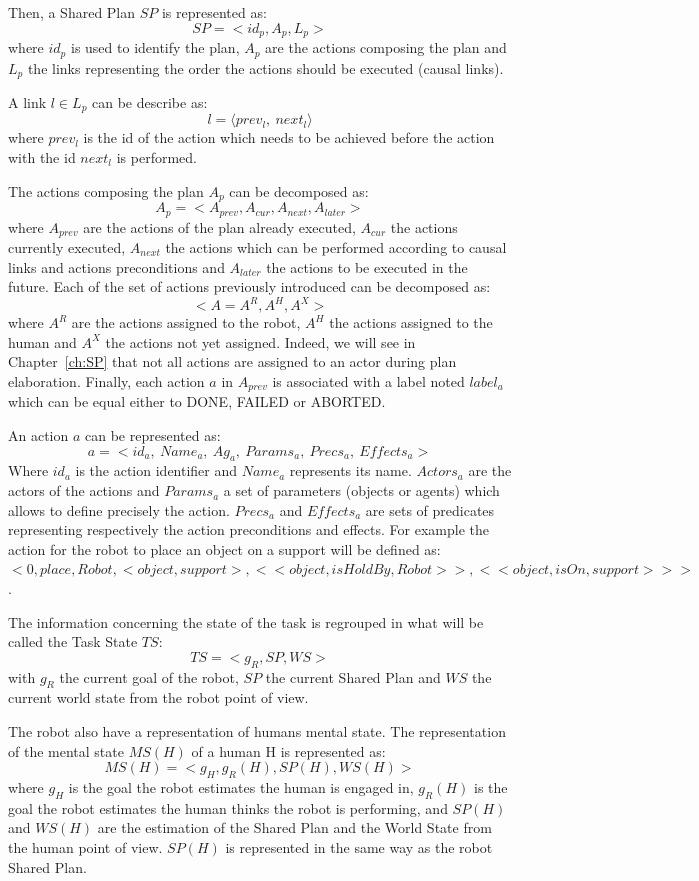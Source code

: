 \documentclass[english,a4paper,11pt,twoside]{StyleThese}
\begin{document}
Then, a Shared Plan $SP$ is represented as:
$$SP = <id_p, A_p, L_p>$$
where $id_p$ is used to identify the plan, $A_p$ are the actions composing the plan and $L_p$ the links representing the order the actions should be executed (causal links).

A link $l \in L_p$ can be describe as:
 $$l = \langle prev_l, \ next_l \rangle$$
where $prev_l$ is the id of the action which needs to be achieved before the action with the id $next_l$ is performed. 

The actions composing the plan $A_p$ can be decomposed as:
$$A_p = <A_{prev}, A_{cur}, A_{next}, A_{later}>$$
where $A_{prev}$ are the actions of the plan already executed, $A_{cur}$ the actions currently executed, $A_{next}$ the actions which can be performed according to causal links and actions preconditions and $A_{later}$ the actions to be executed in the future.
Each of the set of actions previously introduced can be decomposed as:
$$<A = A^R, A^H, A^X>$$
where $A^R$ are the actions assigned to the robot, $A^H$ the actions assigned to the human and $A^X$ the actions not yet assigned. Indeed, we will see in Chapter~\ref{ch:SP} that not all actions are assigned to an actor during plan elaboration.
Finally, each action $a$ in $A_{prev}$ is associated with a label noted $label_a$ which can be equal either to DONE, FAILED or ABORTED.

An action $a$ can be represented as: 
$$a = < id_{a}, \ Name_{a}, \ Ag_{a}, \ Params_{a}, \ Precs_{a}, \ Effects_{a} >$$
Where $id_{a}$ is the action identifier and $Name_{a}$ represents its name. $Actors_{a}$ are the actors of the actions and $Params_{a}$ a set of parameters (objects or agents) which allows to define precisely the action. $Precs_{a}$ and $Effects_{a}$ are sets of predicates representing respectively the action preconditions and effects.
For example the action for the robot to place an object on a support will be defined as:$<0, place, Robot, <object, support>, <<object, isHoldBy, Robot>>, <<object, isOn, support>>>$.

The information concerning the state of the task is regrouped in what will be called the Task State $TS$:
$$TS = <g_R, SP, WS>$$
with $g_R$ the current goal of the robot, $SP$ the current Shared Plan and $WS$ the current world state from the robot point of view.

The robot also have a representation of humans mental state. The representation of the mental state $MS(H)$ of a human H is represented as:
$$MS(H) = <g_H, g_R(H), SP(H), WS(H)>$$
where $g_H$ is the goal the robot estimates the human is engaged in, $g_R(H)$ is the goal the robot estimates the human thinks the robot is performing, and $SP(H)$ and $WS(H)$ are the estimation of the Shared Plan and the World State from the human point of view.
$SP(H)$ is represented in the same way as the robot Shared Plan.


\ifdefined{}
\else


\end{document}
